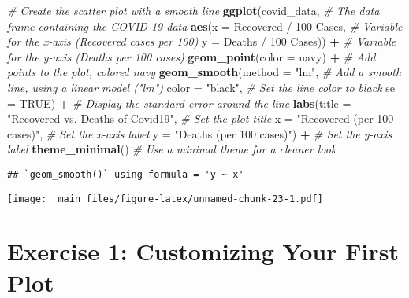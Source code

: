 \documentclass[
]{book}
\newenvironment{Shaded}{\begin{snugshade}}{\end{snugshade}}
\newcommand{\AttributeTok}[1]{\textcolor[rgb]{0.13,0.29,0.53}{#1}}
\newcommand{\CommentTok}[1]{\textcolor[rgb]{0.56,0.35,0.01}{\textit{#1}}}
\newcommand{\ConstantTok}[1]{\textcolor[rgb]{0.56,0.35,0.01}{#1}}
\newcommand{\FunctionTok}[1]{\textcolor[rgb]{0.13,0.29,0.53}{\textbf{#1}}}
\newcommand{\NormalTok}[1]{#1}
\newcommand{\SpecialCharTok}[1]{\textcolor[rgb]{0.81,0.36,0.00}{\textbf{#1}}}
\newcommand{\StringTok}[1]{\textcolor[rgb]{0.31,0.60,0.02}{#1}}
\begin{document}
\begin{Shaded}
\begin{Highlighting}[]
\CommentTok{\# Create the scatter plot with a smooth line}
\FunctionTok{ggplot}\NormalTok{(covid\_data, }\CommentTok{\# The data frame containing the COVID{-}19 data}
       \FunctionTok{aes}\NormalTok{(}\AttributeTok{x =} \StringTok{\textasciigrave{}}\AttributeTok{Recovered / 100 Cases}\StringTok{\textasciigrave{}}\NormalTok{, }\CommentTok{\# Variable for the x{-}axis (Recovered cases per 100)}
           \AttributeTok{y =} \StringTok{\textasciigrave{}}\AttributeTok{Deaths / 100 Cases}\StringTok{\textasciigrave{}}\NormalTok{)) }\SpecialCharTok{+} \CommentTok{\# Variable for the y{-}axis (Deaths per 100 cases)}
  \FunctionTok{geom\_point}\NormalTok{(}\AttributeTok{color =} \StringTok{\textquotesingle{}navy\textquotesingle{}}\NormalTok{) }\SpecialCharTok{+} \CommentTok{\# Add points to the plot, colored navy}
  \FunctionTok{geom\_smooth}\NormalTok{(}\AttributeTok{method =} \StringTok{"lm"}\NormalTok{, }\CommentTok{\# Add a smooth line, using a linear model ("lm")}
              \AttributeTok{color =} \StringTok{"black"}\NormalTok{, }\CommentTok{\# Set the line color to black}
              \AttributeTok{se =} \ConstantTok{TRUE}\NormalTok{) }\SpecialCharTok{+} \CommentTok{\# Display the standard error around the line}
  \FunctionTok{labs}\NormalTok{(}\AttributeTok{title =} \StringTok{"Recovered vs. Deaths of Covid19"}\NormalTok{, }\CommentTok{\# Set the plot title}
       \AttributeTok{x =} \StringTok{"Recovered (per 100 cases)"}\NormalTok{, }\CommentTok{\# Set the x{-}axis label}
       \AttributeTok{y =} \StringTok{"Deaths (per 100 cases)"}\NormalTok{) }\SpecialCharTok{+} \CommentTok{\# Set the y{-}axis label}
  \FunctionTok{theme\_minimal}\NormalTok{() }\CommentTok{\# Use a minimal theme for a cleaner look}
\end{Highlighting}
\end{Shaded}

\begin{verbatim}
## `geom_smooth()` using formula = 'y ~ x'
\end{verbatim}

\texttt{[image: \_main\_files/figure-latex/unnamed-chunk-23-1.pdf]}

\section{Exercise 1: Customizing Your First Plot}\label{exercise-1-customizing-your-first-plot}
\end{document}
